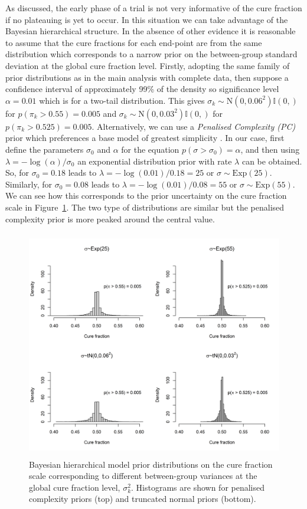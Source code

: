 \documentclass[AMA,STIX1COL]{WileyNJD-v2}
\begin{document}
As discussed, the early phase of a trial is not very informative of the cure fraction if no plateauing is yet to occur. In this situation we can take advantage of the Bayesian hierarchical structure. In the absence of other evidence it is reasonable to assume that the cure fractions for each end-point are from the same distribution which corresponds to a narrow prior on the between-group standard deviation at the global cure fraction level. 
Firstly, adopting the same family of prior distributions as in the main analysis with complete data, then suppose a confidence interval of approximately 99\% of the density so significance level $\alpha = 0.01$ which is for a two-tail distribution.
This gives $\sigma_k \sim \mbox{N}(0, 0.06^2)\mathbb{I}(0,)$ for $p(\pi_k > 0.55) = 0.005$ and $\sigma_k \sim \mbox{N}(0, 0.03^2)\mathbb{I}(0,)$ for $p(\pi_k > 0.525) = 0.005$.
Alternatively, we can use a {\it Penalised Complexity (PC)} prior which preferences a base model of greatest simplicity \cite{Simpson2017}.
In our case, first define the parameters $\sigma_0$ and $\alpha$ for the equation $p(\sigma > \sigma_0) = \alpha$, and then using $\lambda = - \log(\alpha)/\sigma_0$ an exponential distribution prior with rate $\lambda$ can be obtained.
So, for $\sigma_0 = 0.18$ leads to $\lambda = - \log(0.01)/0.18 = 25$ or $\sigma \sim \mbox{Exp}(25)$.
Similarly, for $\sigma_0 = 0.08$ leads to $\lambda = - \log(0.01)/0.08 = 55$ or $\sigma \sim \mbox{Exp}(55)$.
We can see how this corresponds to the prior uncertainty on the cure fraction scale in Figure~\ref{fig:complexityprior}. The two type of distributions are similar but the penalised complexity prior is more peaked around the central value.

\begin{figure}[!ht]
\centering
\includegraphics[height=10cm, width=0.6\linewidth]{complexity-prior-plot.png}
\caption{\label{fig:complexityprior} Bayesian hierarchical model prior distributions on the cure fraction scale corresponding to different between-group variances at the global cure fraction level, $\sigma_k^2$. Histograms are shown for penalised complexity priors (top) and truncated normal priors (bottom).}
\end{figure}
\end{document}
